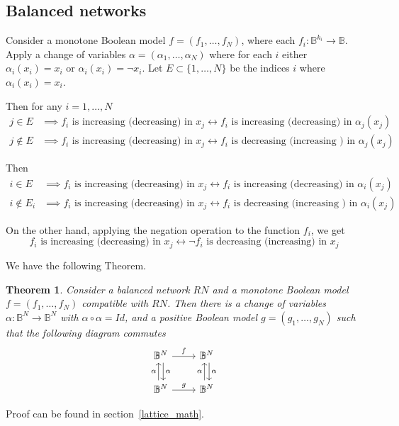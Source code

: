 \documentclass[10pt,letterpaper]{article}
\newcommand{\bbB}{\mathbb{B}}
\newtheorem{thm}{Theorem}[section]
\begin{document}
\subsection{Balanced networks }\label{sec:NL}

Consider a monotone Boolean model $f=(f_1, \ldots, f_N)$,
where each $f_i \colon \bbB^{k_i} \to \bbB$.
Apply a change of variables $\alpha=(\alpha_1, \ldots, \alpha_N)$ where 
for each $i$ either 
 $\alpha_i(x_i)= x_i$ or $\alpha_i(x_i)= \neg x_i$.
Let $E\subset \{1, \ldots, N\}$ be the indices $i$  where $\alpha_i(x_i)= x_i$.

Then for any $i=1, \ldots, N$ 
\begin{align*}
    j \in E & \implies 
    f_i \mbox{ is increasing (decreasing) in } x_j \leftrightarrow  f_i \mbox{ is increasing (decreasing) in } \alpha_j(x_j)    \\
    j \notin E & \implies 
    f_i \mbox{ is increasing (decreasing) in } x_j \leftrightarrow  f_i \mbox{ is decreasing (increasing ) in } \alpha_j(x_j)
\end{align*} 

Then 
\begin{align*}
    i \in E & \implies 
    f_i \mbox{ is increasing (decreasing) in } x_j \leftrightarrow  f_i \mbox{ is increasing (decreasing) in } \alpha_i(x_j)    \\
    i \notin E_i & \implies 
    f_i \mbox{ is increasing (decreasing) in } x_j \leftrightarrow  f_i \mbox{ is decreasing (increasing ) in } \alpha_i(x_j)
\end{align*} 

 On the other hand, applying the negation operation to the function $f_i$, we get 
\[ f_i \mbox{ is increasing (decreasing) in } x_j \leftrightarrow  \neg f_i \mbox{ is decreasing (increasing) in } x_j\]

We have the following Theorem.

\begin{thm} \label{thm:changevar}
Consider a balanced network $RN$ and a monotone Boolean model $f=(f_1, \ldots, f_N)$ compatible with $RN$.
Then there is a change of variables $\alpha: \bbB^N \to \bbB^N$ with $\alpha \circ \alpha = Id$, and a positive Boolean model $g=(g_1, \ldots, g_N)$ such that the following diagram commutes
 \[
    \begin{tikzcd}
        \bbB^N \arrow[r, "f"] \arrow[d,"\alpha",shift left]
        & \bbB^N \arrow[d,"\alpha", shift left]\\
        \bbB^N \arrow[r, "g" ] \arrow[u,"\alpha", shift left]
        & \bbB^N \arrow[u,"\alpha", shift left] %
    \end{tikzcd}
\]
\end{thm}
Proof can be found in section~\ref{lattice_math}.
\end{document}
